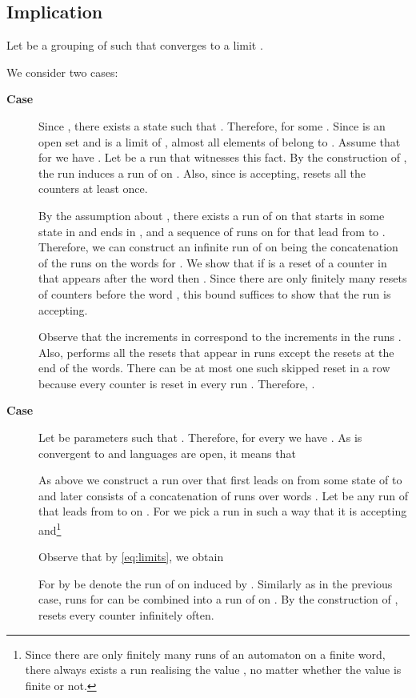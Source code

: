 \documentclass{LMCS}
\begin{document}
\subsection{Implication }

Let  be a grouping of  such that  converges to a limit .

We consider two cases:
\begin{description}
\item[\bf Case ] Since , there exists a state  such that . Therefore,  for some . Since  is an open set and  is a limit of , almost all elements of  belong to . Assume that for  we have . Let  be a run that witnesses this fact. By the construction of , the run  induces a run  of  on . Also, since  is accepting,  resets all the counters at least once.

By the assumption about , there exists a run  of  on  that starts in some state in  and ends in , and a sequence of runs  on  for  that lead from  to . Therefore, we can construct an infinite run  of  on  being the concatenation of the runs  on the words  for . We show that if  is a reset of a counter  in  that appears after the word  then . Since there are only finitely many resets of counters before the word , this bound suffices to show that the run  is accepting.

Observe that the increments in  correspond to the increments in the runs . Also,  performs all the resets that appear in runs  except the resets at the end of the words. There can be at most one such skipped reset in a row because every counter is reset in every run . Therefore, .



\item[\bf Case ] Let  be parameters such that . Therefore, for every  we have . As  is convergent to  and languages  are open, it means that


As above we construct a run  over  that first leads on  from some state of  to  and later consists of a concatenation of runs over words . Let  be any run of  that leads from  to  on . For  we pick a run  in such a way that it is accepting and\footnote{Since there are only finitely many runs of an automaton on a finite word, there always exists a run realising the value , no matter whether the value is finite or not.}

Observe that by \eqref{eq:limits}, we obtain


For  by  be denote the run of  on  induced by . Similarly as in the previous case, runs  for  can be combined into a run  of  on . By the construction of ,  resets every counter infinitely often.


\end{description}
\end{document}
